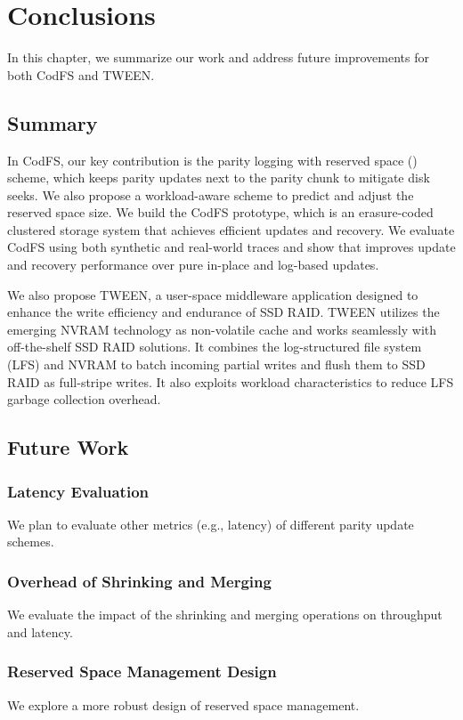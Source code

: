 \chapter{Conclusions}
\label{chap:conclusions}

In this chapter, we summarize our work and address future improvements for both
CodFS and TWEEN.

\section{Summary}

In CodFS, our key contribution is the parity logging with reserved space (\PLR) scheme,
which keeps parity updates next to the parity chunk to mitigate disk seeks. We
also propose a workload-aware scheme to predict and adjust the reserved space
size.  We build the CodFS prototype, which is an erasure-coded clustered storage system
that achieves efficient updates and recovery.  We evaluate CodFS 
using both synthetic and real-world traces and show that \PLR improves update
and recovery performance over pure in-place and log-based updates.  

We also propose TWEEN, a user-space middleware application designed to enhance
the write efficiency and endurance of SSD RAID. TWEEN utilizes the emerging
NVRAM technology as non-volatile cache and works seamlessly with off-the-shelf
SSD RAID solutions. It combines the log-structured file system (LFS) and NVRAM
to batch incoming partial writes and flush them to SSD RAID as full-stripe
writes. It also exploits workload characteristics to reduce LFS garbage
collection overhead. 

\section{Future Work}

\subsection{Latency Evaluation}

We plan to evaluate other metrics (e.g., latency) of different parity
update schemes. 

\subsection{Overhead of Shrinking and Merging}

We evaluate the impact of the shrinking and merging
operations on throughput and latency. 

\subsection{Reserved Space Management Design}

We explore a more robust design of
reserved space management.

